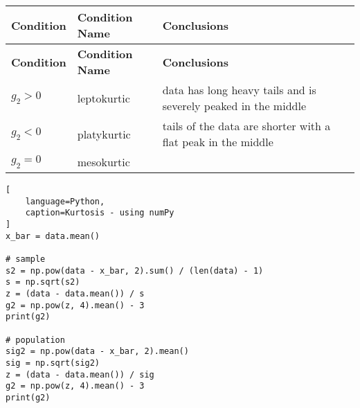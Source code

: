 \begin{longtable}{|l|l|p{10cm}|}
    \hline
    \textbf{Condition} & \textbf{Condition Name} & \textbf{Conclusions}\\ \hline
    \endfirsthead

    \hline
    \textbf{Condition} & \textbf{Condition Name} & \textbf{Conclusions}\\ \hline
    \endhead
    
    \hline

    $g_2 > 0$ & leptokurtic \label{Data/Describing Data/Central Tendency/Kurtosis/leptokurtic} & data has long heavy tails and is severely peaked in the middle \\ \hline

    $g_2 < 0$ & platykurtic \label{Data/Describing Data/Central Tendency/Kurtosis/platykurtic} & tails of the data are shorter with a flat peak in the middle \\ \hline

    $g_2 = 0$ & mesokurtic \label{Data/Describing Data/Central Tendency/Kurtosis/mesokurtic} &  \\ \hline
\end{longtable}

\begin{lstlisting}[
    language=Python, 
    caption=Kurtosis - using numPy
]
x_bar = data.mean()

# sample
s2 = np.pow(data - x_bar, 2).sum() / (len(data) - 1)
s = np.sqrt(s2)
z = (data - data.mean()) / s
g2 = np.pow(z, 4).mean() - 3
print(g2)

# population
sig2 = np.pow(data - x_bar, 2).mean() 
sig = np.sqrt(sig2)
z = (data - data.mean()) / sig
g2 = np.pow(z, 4).mean() - 3
print(g2)
\end{lstlisting}














